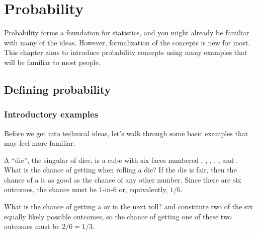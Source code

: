 \chapter{Probability}
\label{probability}
\label{ch_probability}
\renewcommand{\chapterfolder}{ch_probability}



Probability forms a foundation for statistics,
and you might already be familiar with many of the ideas.
However, formalization of the concepts is new for most.
This chapter aims to introduce probability concepts using
many examples that will be familiar to most people.

\section{Defining probability}
\label{basicsOfProbability}



\subsection{Introductory examples}

Before we get into technical ideas, let's walk through
some basic examples that may feel more familiar.

\begin{examplewrap}
\begin{nexample}{A ``die'', the singular of dice, is a cube with six faces numbered , , , , , and . What is the chance of getting  when rolling a die?}\label{probOf1}
If the die is fair, then the chance of a  is as good as the chance of any other number. Since there are six outcomes, the chance must be 1-in-6 or, equivalently, $1/6$.
\end{nexample}
\end{examplewrap}

\begin{examplewrap}
\begin{nexample}{What is the chance of getting a  or  in the next roll?}\label{probOf1Or2}
 and  constitute two of the six equally likely possible outcomes, so the chance of getting one of these two outcomes must be $2/6 = 1/3$.
\end{nexample}
\end{examplewrap}

